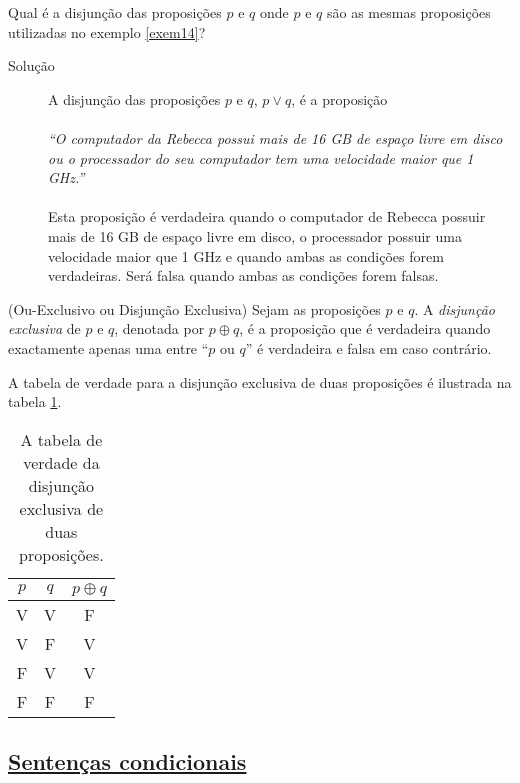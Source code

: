 \label{exem15}
\begin{exmp}
Qual é a disjunção das proposições $p$ e $q$ onde $p$ e $q$ são as mesmas
proposições utilizadas no exemplo \ref{exem14}?
\end{exmp}
\begin{description}
	\item[Solução] A disjunção das proposições $p$ e $q$, $p \lor q$, é a
	proposição\\ \\
	\emph{``O computador da Rebecca possui mais de 16 GB de espaço
	livre em disco ou o processador do seu computador tem uma velocidade maior que
	1 GHz.''} \\ \\
	
	Esta proposição é verdadeira quando o computador de Rebecca possuir mais de 16
	GB de espaço livre em disco, o processador possuir uma velocidade maior que 1
	GHz e quando ambas as condições forem verdadeiras. Será falsa quando ambas as
	condições forem falsas.
\end{description}

\begin{defn}
	\label{def14}
	(Ou-Exclusivo ou Disjunção Exclusiva) Sejam as proposições $p$ e $q$. A
	\emph{disjunção exclusiva} de $p$ e $q$, denotada por $p \oplus q$, é a
	proposição que é verdadeira quando exactamente apenas uma entre ``$p$ ou $q$''
	é verdadeira e falsa em caso contrário.
\end{defn}

A tabela de verdade para a disjunção exclusiva de duas proposições é ilustrada
na tabela \ref{tab14}.

\begin{table}[H]
\centering
\begin{tabular}{|c|c|c|}%
\toprule
\textbf{$p$} & \textbf{$q$} & \textbf{$p \oplus q$}\\ 
\midrule
V &	V & F\\
V &	F & V\\
F &	V & V\\
F &	F & F\\
\bottomrule%
\end{tabular}%
\caption{A tabela de verdade da disjunção exclusiva de duas proposições.}
\label{tab14}
\end{table}

\subsection*{\underline{Sentenças condicionais}}

